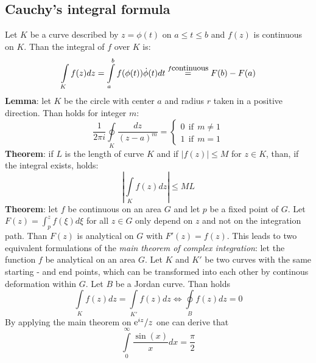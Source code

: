 \documentclass[a4paper,fancyheadings,twoside]{report}
\begin{document}
\subsection{Cauchy's integral formula}
Let $K$ be a curve described by $z=\phi(t)$ on $a\leq t\leq b$ and $f(z)$
is continuous on $K$. Than the integral of $f$ over $K$ is:
\[
\int\limits_Kf(z)dz=\int\limits_a^bf(\phi(t))\dot{\phi}(t)dt
\stackrel{f\mbox{\small continuous}}{=}F(b)-F(a)
\]
{\bf Lemma}: let $K$ be the circle with center $a$ and radius $r$ taken in a
positive direction. Than holds for integer $m$:
\[
\frac{1}{2\pi i}\oint\limits_K \frac{dz}{(z-a)^m}=\left\{
\begin{array}{l}
0~~\mbox{if}~~m\neq1\\
1~~\mbox{if}~~m=1
\end{array}\right.
\]
{\bf Theorem}: if $L$ is the length of curve $K$ and if $|f(z)|\leq M$ for
$z\in K$, than, if the integral exists, holds:
\[
\left|\int\limits_K f(z)dz\right|\leq ML
\]
{\bf Theorem}: let $f$ be continuous on an area $G$ and let $p$ be a fixed
point of $G$. Let $F(z)=\int_p^zf(\xi)d\xi$ for all $z\in G$ only depend on
$z$ and not on the integration path. Than $F(z)$ is analytical on $G$ with
$F'(z)=f(z)$.
\npar
This leads to two equivalent formulations of the {\it main theorem of
complex integration}: let the function $f$ be analytical on an area $G$. Let
$K$ and $K'$ be two curves with the same starting - and end points, which can be
transformed into each other by continous deformation within $G$. Let $B$ be
a Jordan curve. Than holds
\[
\int\limits_Kf(z)dz=\int\limits_{K'}f(z)dz\Leftrightarrow\oint\limits_Bf(z)dz=0
\]
By applying the main theorem on ${\rm e}^{iz}/z$ one can derive that
\[
\int\limits_0^\infty\frac{\sin(x)}{x}dx=\frac{\pi}{2}
\]
\end{document}
